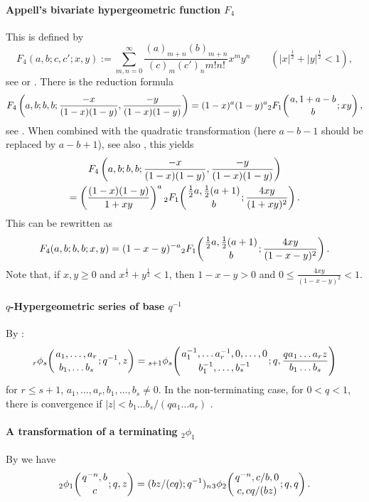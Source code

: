 \documentclass[twoside,11pt]{article}
\newcommand\half{\frac12}
\newcommand\thalf{\tfrac12}
\newcommand\iy\infty
\newcommand{\hyp}[5]{ \mbox{}_{#1}F_{#2}\!\left(
  \genfrac{}{}{0pt}{}{#3}{#4};#5\right)}
\newcommand{\qhypK}[5]{ \mbox{}_{#1}\phi_{#2}\!\left(
  \genfrac{}{}{0pt}{}{#3}{#4};#5\right)}
\begin{document}
\paragraph{Appell's bivariate hypergeometric function $F_4$}
This is defined by
\begin{equation}
F_4(a,b;c,c';x,y):=\sum_{m,n=0}^\iy\frac{(a)_{m+n}(b)_{m+n}}{(c)_m(c')_n m! n!} 
x^my^n\qquad(|x|^\half+|y|^\half<1),
\label{62}
\end{equation}
see  or .
There is the reduction formula
\begin{equation*}
F_4\left(a,b;b,b;\frac{-x}{(1-x)(1-y)},\frac{-y}{(1-x)(1-y)}\right)=
(1-x)^a(1-y)^a \hyp21{a,1+a-b}b{xy},
\end{equation*}
see . When combined with the quadratic transformation
 (here $a-b-1$ should be replaced by $a-b+1$),
see also , this yields
\begin{multline*}
F_4\left(a,b;b,b;\frac{-x}{(1-x)(1-y)},\frac{-y}{(1-x)(1-y)}\right)\\
=\left(\frac{(1-x)(1-y)}{1+xy}\right)^a 
\hyp21{\thalf a,\thalf(a+1)}b{\frac{4xy}{(1+xy)^2}}.
\end{multline*}
This can be rewritten as
\begin{equation}
F_4(a,b;b,b;x,y)=(1-x-y)^{-a} \hyp21{\thalf a,\thalf(a+1)}b
{\frac{4xy}{(1-x-y)^2}}.
\label{63}
\end{equation}
Note that, if $x,y\ge0$ and $x^\half+y^\half<1$, then
$1-x-y>0$ and $0\le\frac{4xy}{(1-x-y)^2}<1$.
%
\paragraph{$q$-Hypergeometric series of base $q^{-1}$}
By :
\begin{equation}
\qhypK rs{a_1,\ldots,a_r}{b_1,\ldots b_s}{q^{-1},z}
=\qhypK{s+1}s{a_1^{-1},\ldots a_r^{-1},0,\ldots,0}
{b_1^{-1},\ldots,b_s^{-1}}{q,\frac{qa_1\ldots a_rz}{b_1\ldots b_s}}
\label{154}
\end{equation}
for $r\le s+1$, $a_1,\ldots,a_r,b_1,\ldots,b_s\ne0$.
In the non-terminating case, for $0<q<1$, there is convergence if
$|z|<b_1\ldots b_s/(qa_1\ldots a_r)$ .
%
\paragraph{A transformation of a terminating ${}_2\phi_1$}
By  we have
\begin{equation}
\qhypK21{q^{-n},b}c{q,z}=(bz/(cq);q^{-1})_n 
\qhypK32{q^{-n},c/b,0}{c,cq/(bz)}{q,q}.
\label{151}
\end{equation}
%
\end{document}
